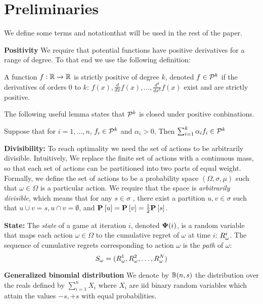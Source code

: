 \documentclass{article}[12pt]
\begin{document}
\section{Preliminaries} \label{sec:preliminaries}

We define some terms and notationthat will be used in the rest of the paper.

{\bf Positivity}
We require that potential functions have positive derivatives for a
range of degree. To that end we use the following definition:
\begin{definition}
A function $f:\reals \to \reals$ is strictly positive of degree $k$, 
denoted $f \in \SP{k}$ if the derivatives of orders 0 to $k$:  
$f(x), \frac{d}{dx}f(x), \ldots, \frac{d^k}{dx^k}f(x)$ exist and are strictly positive.
\end{definition}
The following useful lemma states that $\SP{k}$ is closed under positive conbinations.
\begin{lemma}  \label{lemma:SP-pos-comb}
  Suppose that for $i =1,\ldots,n$, $f_i \in \SP{k}$ and $\alpha_i>0$,
  Then $\sum_{i=1}^k \alpha_i f_i \in \SP{k}$
\end{lemma}


{\bf Divisibility:} To reach optimality we need the set of actions to
be arbitrarily divisible. Intuitively, We replace the finite set of
actions with a continuous mass, so that each set of actions can be
partitioned into two parts of equal weight.  Formally, we define the
set of actions to be a probability space $(\Omega,\sigma,\mu)$ such
that $\omega \in \Omega$ is a particular action. We require that the
space is {\em arbitrarily divisible}, which means that for any
$s \in \sigma$ , there exist a partition $u,v \in \sigma$ such that
$u \cup v = s, u \cap v = \emptyset$, and
$\P{}{u}=\P{}{v}=\frac{1}{2} \P{}{s}$.

{\bf State:} The {\em state} of a game at iteration $i$, denoted $\state(i)$, is
a random variable that maps each action $\omega \in \Omega$ to the
cumulative regret of $\omega$ at time $i$: $\R_\omega^i$. The sequence
of cumulative regrets corresponding to action $\omega$ is the {\em
  path} of $\omega$:
\begin{equation} \label{eqn:path}
  S_{\omega}=(\R_\omega^1,\R_\omega^2,\ldots,\R_\omega^N)
\end{equation}

{\bf  Generalized binomial distribution}
We denote by $\Binom(n,s)$ the distribution over the reals defined by
$\sum_{i=1}^n X_i$ where $X_i$ are iid binary random variables which
attain the values $-s,+s$ with equal probabilities.
\end{document}
